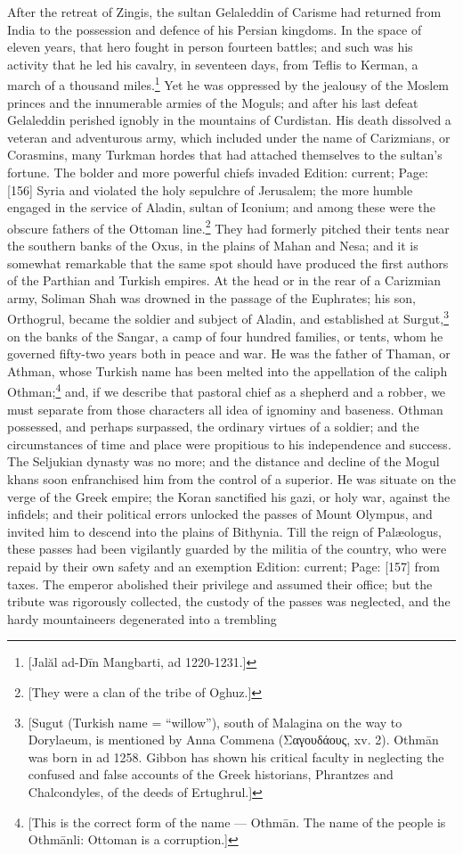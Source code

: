 After the retreat of Zingis, the sultan Gelaleddin of Carisme had returned from India to the possession and defence of his Persian kingdoms. In the space of eleven years, that hero fought in person fourteen battles; and such was his activity that he led his cavalry, in seventeen days, from Teflis to Kerman, a march of a thousand miles.\footnote{[Jalăl ad-Dīn Mangbarti, ad 1220-1231.]} Yet he was oppressed by the jealousy of the Moslem princes and the innumerable armies of the Moguls; and after his last defeat Gelaleddin perished ignobly in the mountains of Curdistan. His death dissolved a veteran and adventurous army, which included under the name of Carizmians, or Corasmins, many Turkman hordes that had attached themselves to the sultan\texthebrew{}’s fortune. The bolder and more powerful chiefs invaded Edition: current; Page: [156] Syria and violated the holy sepulchre of Jerusalem; the more humble engaged in the service of Aladin, sultan of Iconium; and among these were the obscure fathers of the Ottoman line.\footnote{[They were a clan of the tribe of Oghuz.]} They had formerly pitched their tents near the southern banks of the Oxus, in the plains of Mahan and Nesa; and it is somewhat remarkable that the same spot should have produced the first authors of the Parthian and Turkish empires. At the head or in the rear of a Carizmian army, Soliman Shah was drowned in the passage of the Euphrates; his son, Orthogrul, became the soldier and subject of Aladin, and established at Surgut,\footnote{[Sugut (Turkish name = \texthebrew{“}willow\texthebrew{}”), south of Malagina on the way to Dorylaeum, is mentioned by Anna Commena (\textgreek{Σαγουδάους}, xv. 2). Othmān was born in ad 1258. Gibbon has shown his critical faculty in neglecting the confused and false accounts of the Greek historians, Phrantzes and Chalcondyles, of the deeds of Ertughrul.]} on the banks of the Sangar, a camp of four hundred families, or tents, whom he governed fifty-two years both in peace and war. He was the father of Thaman, or Athman, whose Turkish name has been melted into the appellation of the caliph Othman;\footnote{[This is the correct form of the name \texthebrew{—} Othmān. The name of the people is Othmānli: Ottoman is a corruption.]} and, if we describe that pastoral chief as a shepherd and a robber, we must separate from those characters all idea of ignominy and baseness. Othman possessed, and perhaps surpassed, the ordinary virtues of a soldier; and the circumstances of time and place were propitious to his independence and success. The Seljukian dynasty was no more; and the distance and decline of the Mogul khans soon enfranchised him from the control of a superior. He was situate on the verge of the Greek empire; the Koran sanctified his gazi, or holy war, against the infidels; and their political errors unlocked the passes of Mount Olympus, and invited him to descend into the plains of Bithynia. Till the reign of Palæologus, these passes had been vigilantly guarded by the militia of the country, who were repaid by their own safety and an exemption Edition: current; Page: [157] from taxes. The emperor abolished their privilege and assumed their office; but the tribute was rigorously collected, the custody of the passes was neglected, and the hardy mountaineers degenerated into a trembling 